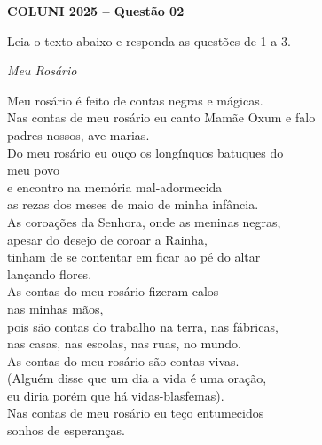 \textbf{COLUNI 2025 -- Questão 02}\par\medskip Leia o texto abaixo e responda as questões de 1 a 3.\par\medskip

\begin{center}\textit{Meu Rosário}\end{center}

\noindent
\begin{minipage}[t]{0.49\linewidth}
Meu rosário é feito de contas negras e mágicas.\\
Nas contas de meu rosário eu canto Mamãe Oxum e falo\\
padres-nossos, ave-marias.\\
Do meu rosário eu ouço os longínquos batuques do\\
meu povo\\
e encontro na memória mal-adormecida\\
as rezas dos meses de maio de minha infância.\\
As coroações da Senhora, onde as meninas negras,\\
apesar do desejo de coroar a Rainha,\\
tinham de se contentar em ficar ao pé do altar\\
lançando flores.\\
As contas do meu rosário fizeram calos\\
nas minhas mãos,\\
pois são contas do trabalho na terra, nas fábricas,\\
nas casas, nas escolas, nas ruas, no mundo.\\
As contas do meu rosário são contas vivas.\\
(Alguém disse que um dia a vida é uma oração,\\
eu diria porém que há vidas-blasfemas).\\
Nas contas de meu rosário eu teço entumecidos\\
sonhos de esperanças.
\end{minipage}\hfill
